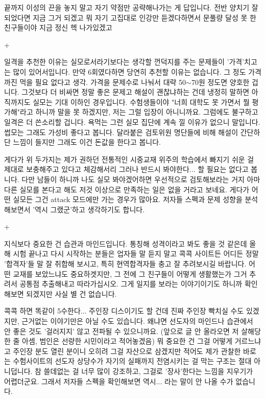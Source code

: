 끝까지 이성의 끈을 놓지 말고 자기 약점만 공략해나가는 게 답입니다. 전반 양치기 잘 되었다면 지금 그거 되겠고
뭐 자기 고집대로 인강만 듣겠다하면서 문풀량 달성 못 한 친구들이야 지금 정신 헥 나가있겠고
\vspace{5mm}

+
\vspace{5mm}

일격을 추천한 이유는 실모로서라기보다는 생각할 껀덕지를 주는 문제들이 '가격'치고는 많이 있어서입니다.
만약 6회였다하면 당연히 추천할 이유는 없습니다. 그 정도 가격까진 먹을 필요 없다고 생각.
가격을 문제수로 나눠서 대략 50$\sim$70원 정도면 양호한 겁니다. 그것보다 더 비싸면 정말 좋은 문제고 해설이 괜찮냐하는 건데
냉정히 말하면 아직까지도 실모는 기대 이하인 경우입니다.
수험생들이야 "너희 대학도 못 가면서 뭘 평가해"라고 하니까 말을 못 하겠지만, 저는 그럴 입장이 아니니까요.
그럼에도 불구하고 일격은 더 쓴소리할 겁니다. 욕먹는 그런 실모 집단에 계속 낄 이유가 없으니 말입니다.
썹모는 그래도 가성비 좋다고 봅니다. 달라붙은 검토위원 명단들에 비해 해설이 간단하단 느낌이 들지만 그래도 이건 돈값을 한다고 봅니다.
\vspace{5mm}

게다가 위 두가지는 제가 권하던 전통적인 시중교재 위주의 학습에서 빠지기 쉬운 걸 제대로 보충해주고 있다고 체감해서리
그러나 반드시 봐야한다... 할 필요는 없다고 봅니다. 다만 남들이 하니까 나도 실모 봐야겠어하면 우선적으로 검토해보라는 거지
아마 다른 실모를 본다고 해도 저것 이상으로 만족하는 일은 없을 거라고 보네요.
게다가 어떤 실모든 그건 attack 모드에만 가는 경우가 많아요. 저자들 스펙과 문제 성향을 분석해보면서 '역시 그랬군'하고 생각하기도 합니다.
\vspace{5mm}

+
\vspace{5mm}

지식보다 중요한 건 습관과 마인드입니다. 통칭해 성격이라고 봐도 좋을 것 같은데
올해 시험 끝나고 다시 시작하는 분들은 업자들 말 듣지 말고
콕콕 사이트든 어디든 정말 '합격자'들 말 잘 취합해 보시고, 특히 현역합격자들 충고 잘 추려보시길 바랍니다.
어떤 교재를 보았느냐도 중요하겟지만, 그 전에 그 친구들이 어떻게 생활했는가 그거 추려서 공통점 추출해내고 따라가십시오.
그게 일지를 보라는 이야기이기도 하니까 확인해보면 되겠지만 사실 별 건 없습니다.
\vspace{5mm}

콕콕 하면 똑같이 5수한다... 주인장 디스이기도 할 건데 진짜 주인장 빡치실 수도 있겠지만,
근거없는 이야기만은 아닐 수도 있습니다. 왜냐면 선도자의 마인드나 습관에서 안 좋은 것도 '걸러지지' 않고 전파될 수 있으니까요.
(앞으로 글 안 올라오면 저 살해당한 줄 아셈, 범인은 선량한 시민이라고 적어놓겠음)
뭐 중요한 건 그걸 어떻게 거르느냐고 주인장 분도 열린 분이니 오히려 그걸 자산으로 삼겠지만
적어도 제가 관찰한 바로는 수험사이트의 선도자 상당수가 자기의 실패까지 전염시키는 걸 막는 구조는 절대 아니덥니다.
참 쓸데없는 걸 너무 많이 강조하고, 그걸로 '장사'한다는 느낌을 지우기가 어렵더군요.
그래서 저자들 스펙을 확인해보면 역시... 라는 말이 안 나올 수가 없습니다.
\vspace{5mm}


